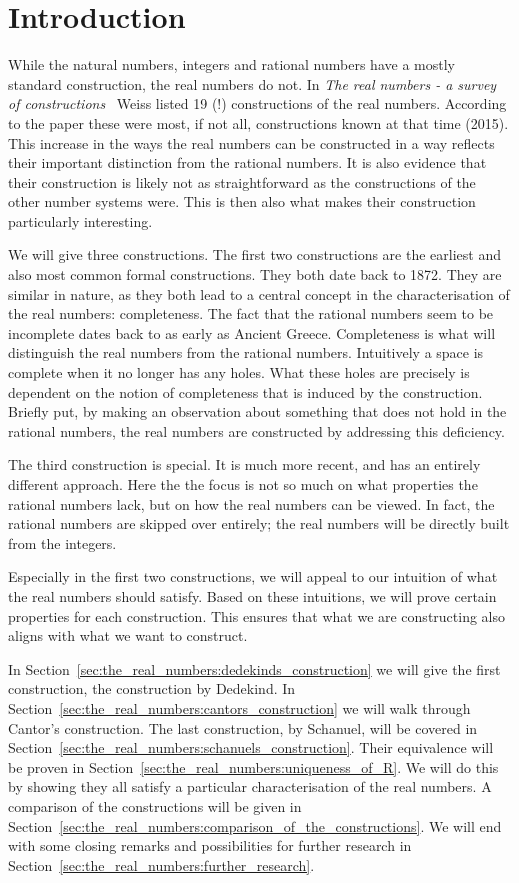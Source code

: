 \documentclass[../main.tex]{subfiles}
\begin{document}
\section*{Introduction}
While the natural numbers, integers and rational numbers have a mostly standard construction, the real numbers do not. In \textit{The real numbers - a survey of constructions}~\cite{Weiss2015} Weiss listed 19 (!) constructions of the real numbers. According to the paper these were most, if not all, constructions known at that time (2015). This increase in the ways the real numbers can be constructed in a way reflects their important distinction from the rational numbers. It is also evidence that their construction is likely not as straightforward as the constructions of the other number systems were. This is then also what makes their construction particularly interesting.

We will give three constructions. The first two constructions are the earliest and also most common formal constructions. They both date back to 1872. They are similar in nature, as they both lead to a central concept in the characterisation of the real numbers: completeness. The fact that the rational numbers seem to be incomplete dates back to as early as Ancient Greece. Completeness is what will distinguish the real numbers from the rational numbers. Intuitively a space is complete when it no longer has any holes. What these holes are precisely is dependent on the notion of completeness that is induced by the construction. Briefly put, by making an observation about something that does not hold in the rational numbers, the real numbers are constructed by addressing this deficiency.

The third construction is special. It is much more recent, and has an entirely different approach. Here the the focus is not so much on what properties the rational numbers lack, but on how the real numbers can be viewed. In fact, the rational numbers are skipped over entirely; the real numbers will be directly built from the integers.

Especially in the first two constructions, we will appeal to our intuition of what the real numbers should satisfy. Based on these intuitions, we will prove certain properties for each construction. This ensures that what we are constructing also aligns with what we want to construct.

In Section~\ref{sec:the_real_numbers:dedekinds_construction} we will give the first construction, the construction by Dede\-kind. In Section~\ref{sec:the_real_numbers:cantors_construction} we will walk through Cantor's construction. The last construction, by Schanuel, will be covered in Section~\ref{sec:the_real_numbers:schanuels_construction}. Their equivalence will be proven in Section~\ref{sec:the_real_numbers:uniqueness_of_R}. We will do this by showing they all satisfy a particular characterisation of the real numbers. A comparison of the constructions will be given in Section~\ref{sec:the_real_numbers:comparison_of_the_constructions}. We will end with some closing remarks and possibilities for further research in Section~\ref{sec:the_real_numbers:further_research}.
\end{document}
